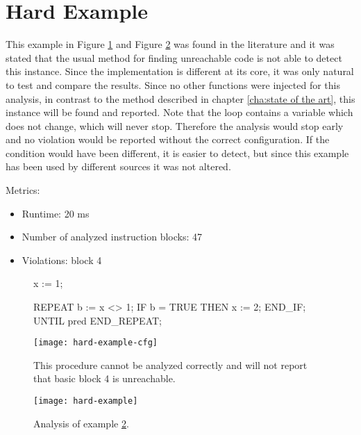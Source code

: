 \section{Hard Example}
This example in Figure \ref{code:hard example 1} and Figure \ref{code:hard example 1 cfg} was found in the literature \cite{Click_1995} and it was stated that the usual method for finding unreachable code is not able to detect this instance. 
Since the implementation is different at its core, it was only natural to test and compare the results.
Since no other functions were injected for this analysis, in contrast to the method described in chapter \ref{cha:state of the art}, this instance will be found and reported.
Note that the loop contains a variable which does not change, which will never stop. Therefore the analysis would stop early and no violation would be reported without the correct configuration. 
If the condition would have been different, it is easier to detect, but since this example has been used by different sources it was not altered.


Metrics:
\begin{itemize}
	\item Runtime: 20 ms
	\item Number of analyzed instruction blocks: 47
	\item Violations: block 4
\end{itemize}

\begin{figure}
	\begin{GenericCode}
x := 1;
	
REPEAT
	b := x <> 1;
	IF b = TRUE THEN
		x := 2;
	END_IF;    
UNTIL pred
END_REPEAT;	\end{GenericCode}
	\centering
	\texttt{[image: hard-example-cfg]}
	\caption{This procedure cannot be analyzed correctly and will not report that basic block 4 is unreachable. }
	\label{code:hard example 1}
\end{figure}
\begin{figure}
	\centering
	\texttt{[image: hard-example]}
	\caption{Analysis of example \ref{code:hard example 1 cfg}.}
	\label{code:hard example 1 cfg}
\end{figure}



